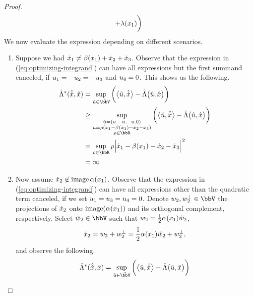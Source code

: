 \begin{proof}
\begin{align}
\begin{aligned}[t]
      + \lambda(x_1) \bigg)
    \end{aligned}
  \end{align}
  We now evaluate the expression depending on different scenarios.
  \begin{enumerate}
    \item
      Suppose we had $\dot{x}_1 \neq \beta(x_1) + \dot{x}_2 + \dot{x}_3$.
      Observe that the expression in (\ref{eq:optimizing-integrand}) can have all expressions but the first summand canceled, if $u_1 = -u_2 = -u_3$ and $u_4 = 0$.
      This shows us the following.
      \begin{align*}
        \hat\ode^*(\hat{\diffVar}, \hat\stateVar) 
        &= \sup_{\hat\momentVar \in \hat\vecSpace} \bigg( \bprj{\hat\momentVar}{\hat\diffVar} - \hat\ode\big(\hat\momentVar, \hat\stateVar\big) \bigg) \\
        &\geq \sup_{\substack{\hat\momentVar=(\momentVar, -\momentVar, -\momentVar, 0) \\ \momentVar = \rho (\diffVar_1 - \affDrift(\stateVar_1) - \diffVar_2 - \diffVar_3) \\ \rho \in \bbR}} \bigg( \bprj{\hat\momentVar}{\hat\diffVar} - \hat\ode\big(\hat\momentVar, \hat\stateVar\big) \bigg) \\
        &= \sup_{\rho\in\bbR} \rho \Big| \diffVar_1 - \affDrift(\stateVar_1) - \diffVar_2 - \diffVar_3 \Big|^2 \\
        &= \infty
      \end{align*}
    \item
      Now assume $\dot{x}_2 \not\in \operatorname{image}\alpha(x_1)$.
      Observe that the expression in (\ref{eq:optimizing-integrand}) can have all expressions other than the quadratic term canceled, if we set $u_1 = u_3 = u_4 = 0$. 
      Denote $w_2, w_2^\bot \in \vecSpace$ the projections of $\dot{x}_2$ onto $\operatorname{image}(\alpha(x_1))$ and its orthogonal complement, respectively.
      Select $\tilde w_2 \in \vecSpace$ such that $w_2 = \frac12\alpha(x_1) \tilde w_2$,
      \begin{equation*}
        \dot{x}_2 = w_2 + w_2^\bot = \frac12 \alpha(x_1) \tilde w_2 + w_2^\bot,
      \end{equation*}
      and observe the following.
      \begin{align*}
        \hat\ode^*(\hat{\diffVar}, \hat\stateVar) 
        &= \sup_{\hat\momentVar \in \hat\vecSpace} \bigg( \bprj{\hat\momentVar}{\hat\diffVar} - \hat\ode\big(\hat\momentVar, \hat\stateVar\big) \bigg) \\

\end{align*}
\end{enumerate}
\end{proof}
